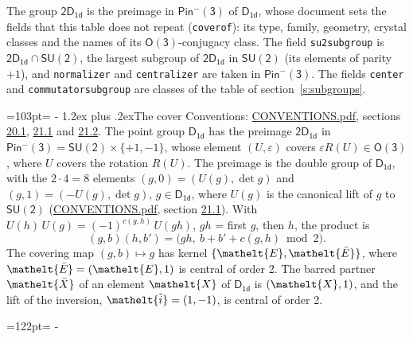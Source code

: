 \documentclass[10pt,a4paper]{article}
\makeatletter
\renewcommand\section{\@startsection{section}{1}{\z@}{-3ex plus -1ex minus -.2ex}%
  {1.2ex plus .2ex}{\normalfont\large\sffamily\bfseries\color{parttitle}}}
\newcommand{\needspace}[1]{\par\penalty-100\begingroup\dimen0=#1\relax\dimen2=\pagegoal
  \advance\dimen2-\pagetotal\ifdim\dimen0>\dimen2\relax\ifdim\dimen2>0pt\vfil\break\fi\fi
  \endgroup}
\numberwithin{equation}{section}
\newcommand{\eltfont}[1]{{\let\sigma\eltsigma\mathelt{#1}}}
\newcommand{\grp}[1]{\mathsf{#1}}
\newcommand{\elt}[1]{\eltfont{#1}}
\newcommand{\dirprod}{\times}
\newcommand{\barred}[1]{\bar{#1}}
\newcommand{\lift}[1]{\tilde{#1}}
\makeatother
\begin{document}
\leavevmode\label{n:element.inversion}\label{n:group.preimage}The group $\grp{2D_{1d}}$ is the preimage in $\grp{Pin^{-}(3)}$ of \href{../../../rotation/data/pdf/D1d.pdf}{$\grp{D_{1d}}$}, whose document sets the fields that this table does not repeat (\texttt{coverof}): its type, family, geometry, crystal classes and the names of its \href{../../../rotation/data/pdf/O3.pdf}{$\grp{O(3)}$}-conjugacy class. The field \texttt{su2subgroup} is $\grp{2D_{1d}} \cap \grp{SU(2)}$, the largest subgroup of $\grp{2D_{1d}}$ in $\grp{SU(2)}$ (its elements of parity $+1$), and \texttt{normalizer} and \texttt{centralizer} are taken in $\grp{Pin^{-}(3)}$. The fields \texttt{center} and \texttt{commutatorsubgroup} are classes of the table of section~\ref{s:subgroups}.
\needspace{103pt}
\section{The cover}\label{s:cover}
Conventions: \href{../../CONVENTIONS.pdf}{CONVENTIONS.pdf}, sections \href{../../CONVENTIONS.pdf\#conv.20.1}{20.1}, \href{../../CONVENTIONS.pdf\#conv.21.1}{21.1} and \href{../../CONVENTIONS.pdf\#conv.21.2}{21.2}.
\leavevmode\label{n:group.pin.minus}\label{n:group.su2}\label{n:local.pin.sign}\label{n:matrix.covered}\label{n:matrix.lift.su2}\label{n:index.bar}The point group $\grp{D_{1d}}$ has the preimage $\grp{2D_{1d}}$ in $\grp{Pin^{-}(3)} = \grp{SU(2)} \dirprod \{+1, -1\}$, whose element $(U, \varepsilon)$ covers $\varepsilon R(U) \in \grp{O(3)}$, where $U$ covers the rotation $R(U)$. The preimage is the double group of $\grp{D_{1d}}$, with the $2 \cdot 4 = 8$ elements $(g, 0) = (U(g), \det g)$ and $(g, 1) = (-U(g), \det g)$, $g \in \grp{D_{1d}}$, where $U(g)$ is the canonical lift of $g$ to $\grp{SU(2)}$ (\href{../../CONVENTIONS.pdf}{CONVENTIONS.pdf}, section \href{../../CONVENTIONS.pdf\#conv.21.1}{21.1}). \label{n:function.cocycle}With $U(h)\,U(g) = (-1)^{c(g,h)}\,U(gh)$, $gh$ = first $g$, then $h$, the product is
\begin{equation}\label{e:product}(g, b)(h, b') = \bigl(gh,\ b + b' + c(g, h) \bmod 2\bigr).\end{equation}
\leavevmode\label{n:mark.bar}The covering map $(g, b) \mapsto g$ has kernel $\{\elt{E}, \elt{\barred{E}}\}$, where $\elt{\barred{E}} = (\elt{E}, 1)$ is central of order 2. \label{n:element.named}\label{n:mark.lift}The barred partner $\elt{\barred{X}}$ of an element $\elt{X}$ of $\grp{D_{1d}}$ is $(\elt{X}, 1)$, and the lift of the inversion, $\elt{\lift{i}} = (1, -1)$, is central of order 2.
\needspace{122pt}
\end{document}
